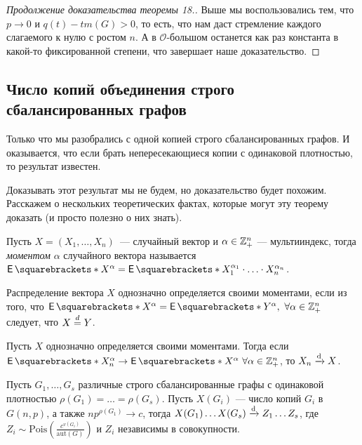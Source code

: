 \begin{proof}[Продолжение доказательства теоремы 18.]
  Выше мы воспользовались тем, что $p \to 0$ и $q(t) - tm(G) > 0$, то есть, что
  нам даст стремление каждого слагаемого к нулю с ростом $n$. А в 
  $\mathcal{O}$-большом останется как раз константа в какой-то фиксированной
  степени, что завершает наше доказательство.
\end{proof}


\subsection{Число копий объединения строго сбалансированных графов}

Только что мы разобрались с одной копией строго сбалансированных графов. И оказывается,
что если брать непересекающиеся копии с одинаковой плотностью, то результат известен.

Доказывать этот результат мы не будем, но доказательство будет похожим. Расскажем
о нескольких теоретических фактах, которые могут эту теорему доказать (и просто
полезно о них знать).

\begin{definition}
  Пусть $X = (X_1, \ldots, X_n)$~--- случайный вектор и $\alpha \in \mathbb{Z}_+^n$ ---
  мультииндекс, тогда \textit{моментом} $\alpha$ случайного вектора называется 
  $\E{X^\alpha} = \E{X_1^{\alpha_1}\cdot\ldots\cdot X_n^{\alpha_n}}$.
\end{definition}

\begin{definition}
  Распределение вектора $X$ однозначно определяется своими моментами, если из того,
  что $\E{X^\alpha} = \E{Y^\alpha}, \ \forall \alpha \in \Z_+^n$ следует, что $X \overset{d}{=} Y$.
\end{definition}

\begin{lemma}
  Пусть $X$ однозначно определяется своими моментами. Тогда если 
  $\E{X_n^\alpha} \to \E{X^\alpha} \ \forall \alpha \in \Z_+^n$, то $X_n \xrightarrow{\mathrm{d}} X$.
\end{lemma}

\begin{theorem}
  Пусть $G_1, \ldots,G_s$ различные строго сбалансированные графы с одинаковой
  плотностью $\rho(G_1) = \ldots = \rho(G_s)$.
  Пусть $X(G_i)$ --- число копий $G_i$ в $G(n, p)$, а также
  $np^{\rho(G_1)} \to c$, тогда
  $X(G_1)\ldots X(G_s) \xrightarrow{\mathrm{d}} Z_1\ldots Z_s$, где $Z_i \sim 
  \mathrm{Pois}\left(\frac{c^{v(G_i)}}{\mathrm{aut}(G)}\right)$ и $Z_i$ независимы
  в совокупности.
\end{theorem}

